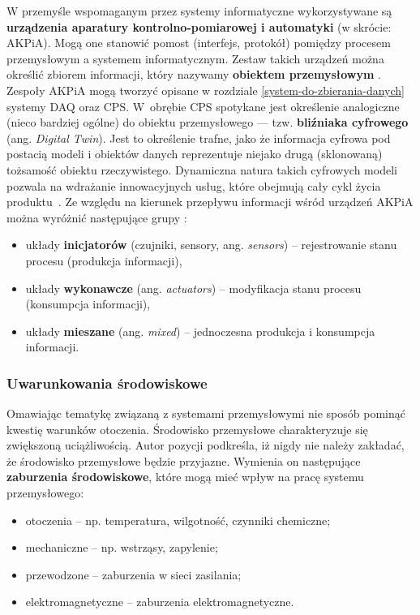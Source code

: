 \documentclass[a4paper, 12pt, twoside]{article}
\begin{document}
W przemyśle wspomaganym przez systemy informatyczne wykorzystywane są 
\textbf{urządzenia aparatury kontrolno-pomiarowej i automatyki} (w skrócie: AKPiA). 
Mogą one stanowić pomost (interfejs, protokół) pomiędzy procesem przemysłowym a systemem informatycznym. 
Zestaw takich urządzeń można określić zbiorem informacji, który nazywamy
\textbf{obiektem przemysłowym} \cite{isp}. Zespoły AKPiA mogą tworzyć opisane
w rozdziale \ref{system-do-zbierania-danych} systemy DAQ oraz CPS. W~obrębie
CPS spotykane jest określenie analogiczne (nieco bardziej ogólne) do obiektu przemysłowego --- 
tzw. \textbf{bliźniaka cyfrowego} (ang. \emph{Digital Twin}). 
Jest to określenie trafne, jako że informacja cyfrowa pod postacią modeli i obiektów
danych reprezentuje niejako drugą (sklonowaną) tożsamość obiektu rzeczywistego.
Dynamiczna natura takich cyfrowych modeli pozwala na wdrażanie innowacyjnych usług,
które obejmują cały cykl życia produktu~\cite{iiot-challenges-opportunities-directions}. 
Ze względu na kierunek przepływu
informacji wśród urządzeń AKPiA można wyróżnić następujące grupy \cite{isp}:
\begin{itemize}
    \item układy \textbf{inicjatorów} (czujniki, sensory, ang. \emph{sensors}) -- rejestrowanie stanu procesu (produkcja informacji),
    \item układy \textbf{wykonawcze} (ang. \emph{actuators}) -- modyfikacja stanu procesu (konsumpcja informacji),
    \item układy \textbf{mieszane} (ang. \emph{mixed}) -- jednoczesna produkcja i konsumpcja informacji.
\end{itemize}

\subsubsection*{Uwarunkowania środowiskowe} 

Omawiając tematykę związaną z systemami przemysłowymi nie sposób pominąć kwestię
warunków otoczenia. Środowisko przemysłowe charakteryzuje się zwiększoną uciążliwością.
Autor pozycji \cite{isp} podkreśla, iż nigdy nie należy zakładać, że środowisko przemysłowe
będzie przyjazne. Wymienia on następujące \textbf{zaburzenia środowiskowe}, które mogą mieć wpływ na pracę
systemu przemysłowego:
\begin{itemize}
    \item otoczenia -- np. temperatura, wilgotność, czynniki chemiczne;
    \item mechaniczne -- np. wstrząsy, zapylenie;
    \item przewodzone -- zaburzenia w sieci zasilania;
    \item elektromagnetyczne -- zaburzenia elektromagnetyczne.
\end{itemize}
\end{document}
